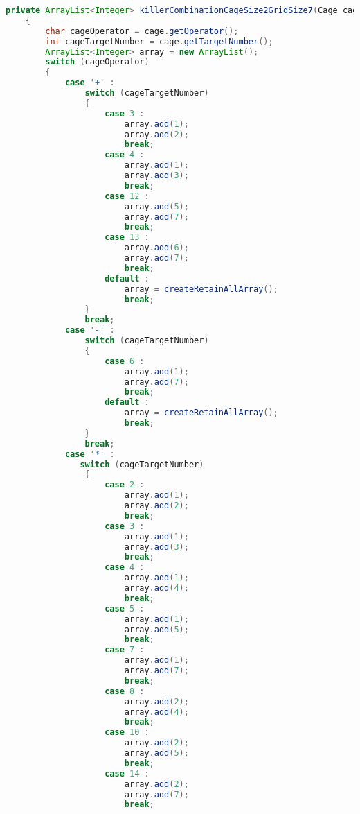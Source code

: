 \begin{lstlisting}[language=Java,basicstyle=\tiny,caption=SolverRuleBased.java]
    private ArrayList<Integer> killerCombinationCageSize2GridSize7(Cage cage)
    {
        char cageOperator = cage.getOperator();
        int cageTargetNumber = cage.getTargetNumber();
        ArrayList<Integer> array = new ArrayList();
        switch (cageOperator)
        {
            case '+' :
                switch (cageTargetNumber)
                {
                    case 3 :
                        array.add(1);
                        array.add(2);
                        break;
                    case 4 :  
                        array.add(1);
                        array.add(3);
                        break;
                    case 12 :
                        array.add(5);
                        array.add(7);
                        break;
                    case 13 :
                        array.add(6);
                        array.add(7);
                        break;
                    default :
                        array = createRetainAllArray();
                        break;
                }
                break;
            case '-' :
                switch (cageTargetNumber)
                {
                    case 6 :
                        array.add(1);
                        array.add(7);
                        break;
                    default :
                        array = createRetainAllArray();
                        break;
                }
                break;
            case '*' :
               switch (cageTargetNumber)
                {
                    case 2 :
                        array.add(1);
                        array.add(2);
                        break;
                    case 3 :
                        array.add(1);
                        array.add(3);
                        break;
                    case 4 :
                        array.add(1);
                        array.add(4);
                        break;
                    case 5 :
                        array.add(1);
                        array.add(5);
                        break;
                    case 7 :
                        array.add(1);
                        array.add(7);
                        break;
                    case 8 :
                        array.add(2);
                        array.add(4);
                        break;
                    case 10 :
                        array.add(2);
                        array.add(5);
                        break;
                    case 14 :
                        array.add(2);
                        array.add(7);
                        break;

\end{lstlisting}

